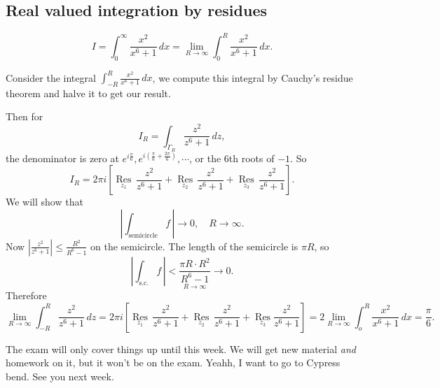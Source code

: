 \subsection{Real valued integration by residues}
\begin{example}
    \[
    I=\int_{0}^{\infty} \frac{x^2}{x^6+1} \, dx=\lim_{R\to \infty }\int_{0}^{R} \frac{x^2}{x^6+1} \, dx.
    \] 
    \begin{note}
        Consider the integral $\int_{-R}^{R} \frac{x^2}{x^6+1} \, dx$, we compute this integral by Cauchy's residue theorem and halve it to get our result.
    \end{note}
Then for \[
I_R=\int_{\Gamma _R}^{} \frac{z^2}{z^6+1} \, dz,
\] the denominator is zero at $e^{i \frac{\pi}{6}},e^{i\left( \frac{\pi}{6}+\frac{2\pi}{6} \right) },\cdots $, or the $6$th roots of $-1$. So \[
I_R=2\pi i \left[  \underset{z_1}{\operatorname{R es}} \, \frac{z^2}{z^6+1}+ \underset{z_2}{\operatorname{R es}} \, \frac{z^2}{z^6+1}+ \underset{z_3}{\operatorname{R es}} \,\frac{z^2}{z^6+1}\right] .
\] 
We will show that \[
    \left| \int_{\text{semicircle}}^{} f  \,\right| \to 0,\quad R\to \infty.
\] Now $\left| \frac{z^2}{z^6+1} \right| \leq \frac{R^2}{R^6-1}$ on the semicircle. The length of the semicircle is $\pi R$, so \[
\left| \int_{\text{s.c.}}^{} f \, \right| < \underset{R\to \infty}{\frac{\pi R\cdot  R^2}{R^6-1}} \to 0.
\] Therefore\[
\lim_{R\to \infty       } \int_{-R}^{R} \frac{z^2}{z^6+1} \, dz=2\pi i \left[ \underset{z_1}{\operatorname{R es}}\, \frac{z^2}{z^6+1}+ \underset{z_2}{\operatorname{ R es}} \, \frac{z^2}{z^6+1}+ \underset{z_3}{\operatorname{R es}}\frac{z^2}{z^6+1}  \right] =2 \lim _{R\to \infty}\int_{o}^{R} \frac{x^2}{x^6+1} \, dx=\frac{\pi}{6}.
\] 
\end{example}
\orbreak
The exam will only cover things up until this week. We will get new material \emph{and} homework on it, but it won't be on the exam. Yeahh, I want to go to Cypress bend. See you next week.
